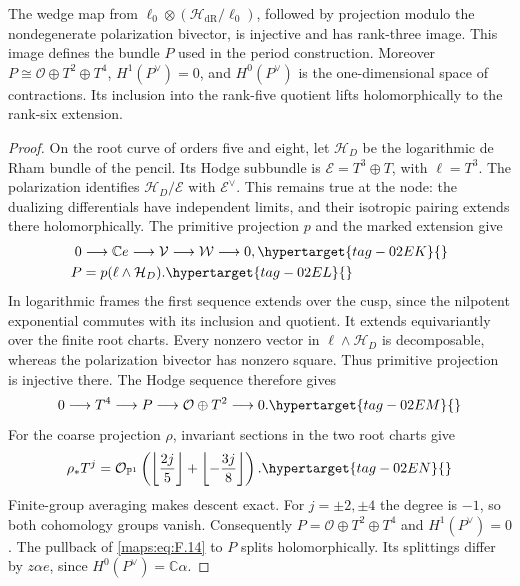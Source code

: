 \begin{theorem}\hypertarget{tag-02QW}{}\label{night:P1.5}
The wedge map from
$\ell_0\otimes(\mathcal H_{\mathrm{dR}}/\ell_0)$, followed by
projection modulo the nondegenerate polarization bivector, is
injective and has rank-three image. This image defines the bundle
$P$ used in the period construction.
Moreover
$P\cong\mathcal O\oplus T^2\oplus T^4$,
$H^1(P^\vee)=0$, and $H^0(P^\vee)$ is the one-dimensional
space of contractions. Its inclusion into the rank-five quotient
lifts holomorphically to the rank-six extension.
\end{theorem}
\begin{proof}
On the root curve of orders five and eight, let $\mathcal H_D$ be
the logarithmic de Rham bundle of the pencil. Its Hodge subbundle is
$\mathcal E=T^3\oplus T$, with $\ell=T^3$. The polarization identifies
$\mathcal H_D/\mathcal E$ with $\mathcal E^\vee$. This remains true
at the node: the dualizing differentials have independent limits,
and their isotropic pairing extends there holomorphically.
The primitive projection $p$ and the marked extension give
\begin{align}
 0&\longrightarrow\mathbb C e\longrightarrow\mathcal V
   \longrightarrow\mathcal W\longrightarrow0,
 \hypertarget{tag-02EK}{}\label{maps:eq:F.14}\\
 P&=p(\ell\wedge\mathcal H_D).
 \hypertarget{tag-02EL}{}\label{maps:eq:F.15}
\end{align}
In logarithmic frames the first sequence extends over the cusp,
since the nilpotent exponential commutes with its inclusion and
quotient. It extends equivariantly over the finite root charts.
Every nonzero vector in $\ell\wedge\mathcal H_D$ is decomposable, whereas the polarization bivector has nonzero square. Thus primitive projection is injective there. The Hodge sequence therefore gives
\begin{equation}
 0\longrightarrow T^4\longrightarrow P
   \longrightarrow\mathcal O\oplus T^2\longrightarrow0.
 \hypertarget{tag-02EM}{}\label{maps:eq:F.16}
\end{equation}
For the coarse projection $\rho$, invariant sections in the two
root charts give
\begin{equation}
 \rho_*T^j=\mathcal O_{\mathbb P^1}
 \left(\left\lfloor\frac{2j}{5}\right\rfloor+
       \left\lfloor-\frac{3j}{8}\right\rfloor\right).
 \hypertarget{tag-02EN}{}\label{maps:eq:F.17}
\end{equation}
Finite-group averaging makes descent exact. For $j=\pm2,\pm4$
the degree is $-1$, so both cohomology groups vanish. Consequently
$P=\mathcal O\oplus T^2\oplus T^4$ and
$H^1(P^\vee)=0$. The pullback of \eqref{maps:eq:F.14} to $P$
splits holomorphically. Its splittings differ by $z\alpha e$,
since $H^0(P^\vee)=\mathbb C\alpha$.
\end{proof}

